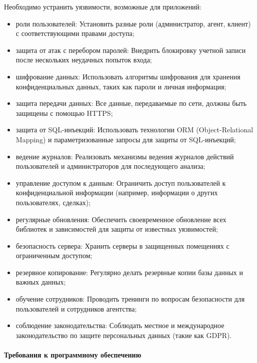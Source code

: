 Необходимо устранить уязвимости, возможные для приложений:
\begin{itemize}
\item роли пользователей: Установить разные роли (администратор, агент, клиент) с соответствующими правами доступа;

\item защита от атак с перебором паролей: Внедрить блокировку учетной записи после нескольких неудачных попыток входа;

\item шифрование данных: Использовать алгоритмы шифрования для хранения конфиденциальных данных, таких как пароли и личная информация;

\item защита передачи данных: Все данные, передаваемые по сети, должны быть защищены с помощью HTTPS;

\item защита от SQL-инъекций: Использовать технологии ORM (Object-Relational Mapping) и параметризованные запросы для защиты от SQL-инъекций;

\item ведение журналов: Реализовать механизмы ведения журналов действий пользователей и администраторов для последующего анализа;

\item управление доступом к данным: Ограничить доступ пользователей к конфиденциальной информации (например, информации о других пользователях, сделках);

\item регулярные обновления: Обеспечить своевременное обновление всех библиотек и зависимостей для защиты от известных уязвимостей;

\item безопасность сервера: Хранить серверы в защищенных помещениях с ограниченным доступом;

\item резервное копирование: Регулярно делать резервные копии базы данных и важных данных;

\item обучение сотрудников: Проводить тренинги по вопросам безопасности для пользователей и сотрудников агентства;

\item соблюдение законодательства: Соблюдать местное и международное законодательство по защите персональных данных (такие как GDPR).
\end{itemize}
\paragraph{Требования к программному обеспечению}


